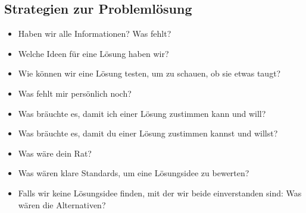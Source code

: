 \subsection{Strategien zur Problemlösung}

\begin{itemize}
  \item Haben wir alle Informationen? Was fehlt?
  \item Welche Ideen für eine Lösung haben wir?
  \item Wie können wir eine Lösung testen, um zu schauen, ob sie etwas taugt?
  \item Was fehlt mir persönlich noch?
  \item Was bräuchte es, damit ich einer Lösung zustimmen kann und will?
  \item Was bräuchte es, damit du einer Lösung zustimmen kannst und willst?
  \item Was wäre dein Rat?
  \item Was wären klare Standards, um eine Lösungsidee zu bewerten?
  \item Falls wir keine Lösungsidee finden, mit der wir beide einverstanden sind: Was wären die Alternativen?
\end{itemize}

